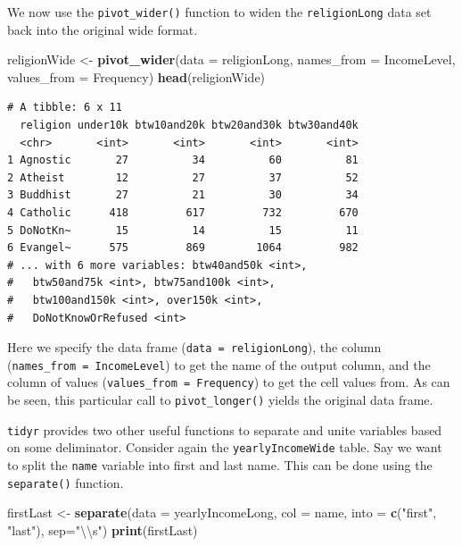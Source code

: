 \documentclass[
]{krantz}
\makeatletter
\newenvironment{Shaded}{\begin{snugshade}}{\end{snugshade}}
\newcommand{\CharTok}[1]{\textcolor[rgb]{0.5,0.5,0.5}{#1}}
\newcommand{\DataTypeTok}[1]{\textcolor[rgb]{0.27,0.27,0.27}{#1}}
\newcommand{\KeywordTok}[1]{\textcolor[rgb]{0.27,0.27,0.27}{\textbf{#1}}}
\newcommand{\NormalTok}[1]{#1}
\newcommand{\StringTok}[1]{\textcolor[rgb]{0.5,0.5,0.5}{#1}}
\newenvironment{kframe}{%
\medskip{}
\setlength{\fboxsep}{.8em}
 \def\at@end@of@kframe{}%
 \ifinner\ifhmode%
  \def\at@end@of@kframe{\end{minipage}}%
  \begin{minipage}{\columnwidth}%
 \fi\fi%
 \def\FrameCommand##1{\hskip\@totalleftmargin \hskip-\fboxsep
 \colorbox{shadecolor}{##1}\hskip-\fboxsep
     \hskip-\linewidth \hskip-\@totalleftmargin \hskip\columnwidth}%
 \MakeFramed {\advance\hsize-\width
   \@totalleftmargin\z@ \linewidth\hsize
   \@setminipage}}%
 {\par\unskip\endMakeFramed%
 \at@end@of@kframe}
\renewenvironment{Shaded}{\begin{kframe}}{\end{kframe}}
\makeatother
\begin{document}
We now use the \texttt{pivot\_wider()} function to widen the \texttt{religionLong} data set back into the original wide format.

\begin{Shaded}
\begin{Highlighting}[]
\NormalTok{religionWide \textless{}{-}}\StringTok{ }\KeywordTok{pivot\_wider}\NormalTok{(}\DataTypeTok{data =}\NormalTok{ religionLong, }
			    \DataTypeTok{names\_from =}\NormalTok{ IncomeLevel, }
			    \DataTypeTok{values\_from =}\NormalTok{ Frequency)}
\KeywordTok{head}\NormalTok{(religionWide)}
\end{Highlighting}
\end{Shaded}

\begin{verbatim}
# A tibble: 6 x 11
  religion under10k btw10and20k btw20and30k btw30and40k
  <chr>       <int>       <int>       <int>       <int>
1 Agnostic       27          34          60          81
2 Atheist        12          27          37          52
3 Buddhist       27          21          30          34
4 Catholic      418         617         732         670
5 DoNotKn~       15          14          15          11
6 Evangel~      575         869        1064         982
# ... with 6 more variables: btw40and50k <int>,
#   btw50and75k <int>, btw75and100k <int>,
#   btw100and150k <int>, over150k <int>,
#   DoNotKnowOrRefused <int>
\end{verbatim}

Here we specify the data frame (\texttt{data\ =\ religionLong}), the column (\texttt{names\_from\ =\ IncomeLevel}) to get the name of the output column, and the column of values (\texttt{values\_from\ =\ Frequency}) to get the cell values from. As can be seen, this particular call to \texttt{pivot\_longer()} yields the original data frame.

\texttt{tidyr} provides two other useful functions to separate and unite variables based on some deliminator. Consider again the \texttt{yearlyIncomeWide} table. Say we want to split the \texttt{name} variable into first and last name. This can be done using the \texttt{separate()} function.

\begin{Shaded}
\begin{Highlighting}[]
\NormalTok{firstLast \textless{}{-}}\StringTok{ }\KeywordTok{separate}\NormalTok{(}\DataTypeTok{data =}\NormalTok{ yearlyIncomeLong, }\DataTypeTok{col =}\NormalTok{ name, }
                      \DataTypeTok{into =} \KeywordTok{c}\NormalTok{(}\StringTok{"first"}\NormalTok{, }\StringTok{"last"}\NormalTok{), }\DataTypeTok{sep=}\StringTok{"}\CharTok{\textbackslash{}\textbackslash{}}\StringTok{s"}\NormalTok{)}
\KeywordTok{print}\NormalTok{(firstLast)}
\end{Highlighting}
\end{Shaded}
\end{document}
